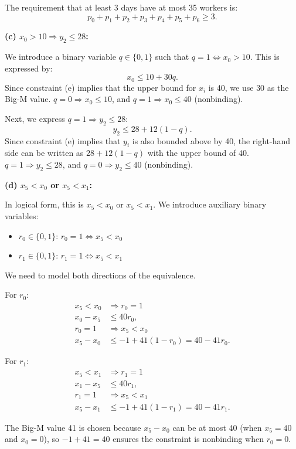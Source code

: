 \documentclass{article}
\begin{document}
\begin{enumerate}
The requirement that at least 3 days have at most 35 workers is:
\[
p_0 + p_1 + p_2 + p_3 + p_4 + p_5 + p_6 \geq 3.
\]

\textbf{(c) $x_0 > 10 \Rightarrow y_2 \leq 28$:}

We introduce a binary variable $q \in \{0,1\}$ such that $q = 1 \Leftrightarrow x_0 > 10$. This is expressed by:
\[
x_0 \leq 10 + 30q.
\]
Since constraint (e) implies that the upper bound for $x_i$ is 40, we use $30$ as the Big-M value. $q = 0 \Rightarrow x_0 \leq 10$, and $q = 1 \Rightarrow x_0 \leq 40$ (nonbinding).

Next, we express $q = 1 \Rightarrow y_2 \leq 28$:
\[
y_2 \leq 28 + 12(1-q).
\]
Since constraint (e) implies that $y_i$ is also bounded above by 40, the right-hand side can be written as $28 + 12(1-q)$ with the upper bound of 40. $q = 1 \Rightarrow y_2 \leq 28$, and $q = 0 \Rightarrow y_2 \leq 40$ (nonbinding).

\textbf{(d) $x_5 < x_0$ or $x_5 < x_1$:}

In logical form, this is $x_5 < x_0$ or $x_5 < x_1$. We introduce auxiliary binary variables:
\begin{itemize}
    \item $r_0 \in \{0,1\}$: $r_0 = 1 \Leftrightarrow x_5 < x_0$
    \item $r_1 \in \{0,1\}$: $r_1 = 1 \Leftrightarrow x_5 < x_1$
\end{itemize}

We need to model both directions of the equivalence.

For $r_0$:
\begin{align*}
x_5 < x_0 &\Rightarrow r_0 = 1 \\
x_0 - x_5 &\leq 40 r_0, \\
r_0 = 1 &\Rightarrow x_5 < x_0 \\
x_5 - x_0 &\leq -1 + 41(1-r_0) = 40 - 41r_0.
\end{align*}

For $r_1$:
\begin{align*}
x_5 < x_1 &\Rightarrow r_1 = 1 \\
x_1 - x_5 &\leq 40 r_1, \\
r_1 = 1 &\Rightarrow x_5 < x_1 \\
x_5 - x_1 &\leq -1 + 41(1-r_1) = 40 - 41r_1.
\end{align*}

The Big-M value 41 is chosen because $x_5 - x_0$ can be at most 40 (when $x_5 = 40$ and $x_0 = 0$), so $-1 + 41 = 40$ ensures the constraint is nonbinding when $r_0 = 0$.


\end{enumerate}
\end{document}
